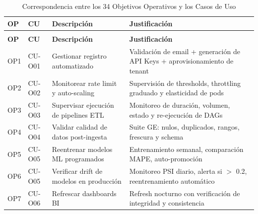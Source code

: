 ﻿\documentclass[11pt, letterpaper]{article}
\begin{document}
\begin{longtable}{>{\raggedright\arraybackslash}p{0.8cm} >{\raggedright\arraybackslash}p{2.2cm} >{\raggedright\arraybackslash}p{7.8cm} >{\raggedright\arraybackslash}p{4.8cm}}

\caption{Correspondencia entre los 34 Objetivos Operativos y los Casos de Uso}\\

\toprule

\textbf{OP} & \textbf{CU} & \textbf{Descripción} & \textbf{Justificación} \\

\midrule

\endfirsthead

\multicolumn{4}{c}{\small \textit{...continuación...}}\\

\toprule

\textbf{OP} & \textbf{CU} & \textbf{Descripción} & \textbf{Justificación} \\

\midrule

\endhead

\midrule

\endfoot

\bottomrule

\endlastfoot

OP1 & CU-O01 & Gestionar registro automatizado & Validación de email + generación de API Keys + aprovisionamiento de tenant \\

OP2 & CU-O02 & Monitorear rate limit y auto-scaling & Supervisión de thresholds, throttling graduado y elasticidad de pods \\

OP3 & CU-O03 & Supervisar ejecución de pipelines ETL & Monitoreo de duración, volumen, estado y re-ejecución de DAGs \\

OP4 & CU-O04 & Validar calidad de datos post-ingesta & Suite GE: nulos, duplicados, rangos, frescura y schema \\

OP5 & CU-O05 & Reentrenar modelos ML programados & Entrenamiento semanal, comparación MAPE, auto-promoción \\

OP6 & CU-O05 & Verificar drift de modelos en producción & Monitoreo PSI diario, alerta si $>$ 0.2, reentrenamiento automático \\

OP7 & CU-O06 & Refrescar dashboards BI & Refresh nocturno con verificación de integridad y consistencia \\


\end{longtable}
\end{document}
